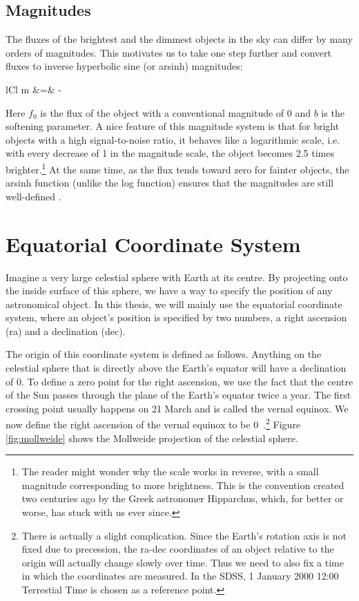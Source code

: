 \subsection{Magnitudes}
The fluxes of the brightest and the dimmest objects in the sky can differ by many orders of
magnitudes. This motivates us to take one step further and convert fluxes to inverse
hyperbolic sine (or arsinh) magnitudes:
	\begin{IEEEeqnarray*}{lCl}
		m &=& - 
	\end{IEEEeqnarray*}
Here $f_0$ is the flux of the object with a conventional magnitude of 0 and $b$ is the
softening parameter. A nice feature of this magnitude system is that for bright objects
with a high signal-to-noise ratio, it behaves like a logarithmic scale, i.e. with
every decrease of 1 in the magnitude scale, the object becomes 2.5 times brighter.\footnote{
	The reader might wonder why the scale works in reverse, with a small magnitude
	corresponding to more brightness. This is the convention created two centuries ago by
	the Greek astronomer Hipparchus, which, for better or worse, has stuck with us ever since.}
At the same time, as the flux tends toward zero for fainter objects, the arsinh function
(unlike the log function) ensures that the magnitudes are still well-defined \cite{lupton99}.


\section{Equatorial Coordinate System}
Imagine a very large celestial sphere with Earth at its centre. By projecting onto the
inside surface of this sphere, we have a way to specify the position
of any astronomical object. In this thesis, we will mainly use the equatorial coordinate system,
where an object's position is specified by two numbers, a right ascension (ra) and a declination
(dec).

The origin of this coordinate system is defined as follows. Anything on the celestial sphere that is
directly above the Earth's equator will have a declination of 0\deg. To define a zero point
for the right ascension, we use the fact that the centre of the Sun passes through the plane of the
Earth's equator twice a year. The first crossing point usually happens on 21 March and is called
the vernal equinox. We now define the right ascension of the vernal equinox to be
0\deg~\cite[Chapter~1]{sparke07}.\footnote{
	There is actually a slight complication. Since the Earth's rotation axis is not
	fixed due to precession, the ra-dec coordinates of an object relative to the origin will
	actually change slowly over time. Thus we need to also fix a time in which the
	coordinates are measured. In the SDSS, 1 January 2000 12:00 Terrestial Time is chosen as
	a reference point.}
Figure \ref{fig:mollweide} shows the Mollweide projection of the celestial sphere.

